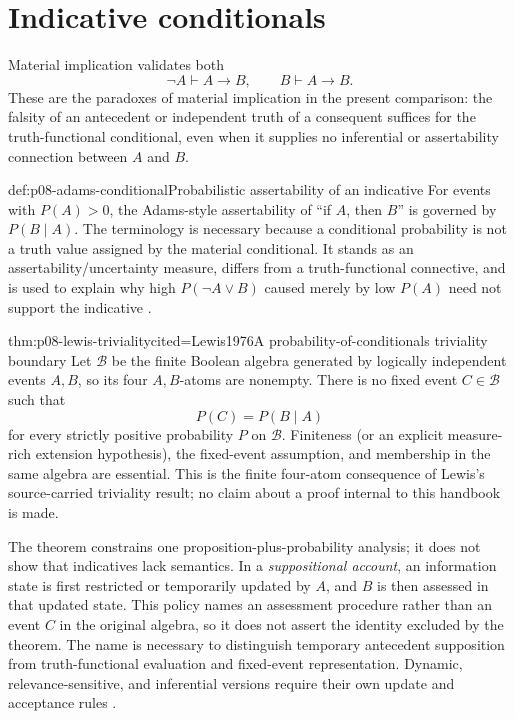 \section{Indicative conditionals}

Material implication validates both
\[
 \neg A\vdash A\to B,
 \qquad
 B\vdash A\to B.
\]
These are the paradoxes of material implication in the present comparison:
the falsity of an antecedent or independent truth of a consequent suffices for
the truth-functional conditional, even when it supplies no inferential or
assertability connection between \(A\) and \(B\).

\begin{hbdefinition}{def:p08-adams-conditional}{Probabilistic assertability of an indicative}
For events with \(P(A)>0\), the Adams-style assertability of ``if \(A\), then
\(B\)'' is governed by \(P(B\mid A)\). The terminology is necessary because a
conditional probability is not a truth value assigned by the material
conditional. It stands as an assertability/uncertainty measure, differs from a
truth-functional connective, and is used to explain why high
\(P(\neg A\vee B)\) caused merely by low \(P(A)\) need not support the
indicative \cite{Adams1975}.
\end{hbdefinition}

\begin{hbtheorem}{thm:p08-lewis-triviality}{cited=Lewis1976}{A probability-of-conditionals triviality boundary}
Let \(\mathcal B\) be the finite Boolean algebra generated by logically
independent events \(A,B\), so its four \(A,B\)-atoms are nonempty.  There is no
fixed event \(C\in\mathcal B\) such that
\[
 P(C)=P(B\mid A)
\]
for every strictly positive probability \(P\) on \(\mathcal B\).
Finiteness (or an explicit measure-rich extension hypothesis), the fixed-event
assumption, and membership in the same algebra are essential.  This is the
finite four-atom consequence of Lewis's source-carried triviality result; no
claim about a proof internal to this handbook is made.
\end{hbtheorem}

The theorem constrains one proposition-plus-probability analysis; it does not
show that indicatives lack semantics.  In a \emph{suppositional account}, an
information state is first restricted or temporarily updated by \(A\), and
\(B\) is then assessed in that updated state.  This policy names an
assessment procedure rather than an event \(C\) in the original algebra, so it
does not assert the identity excluded by the theorem.  The name is necessary
to distinguish temporary antecedent supposition from truth-functional
evaluation and fixed-event representation.  Dynamic,
relevance-sensitive, and inferential versions require their own update and
acceptance rules \cite{Jackson1987,Edgington1995,Bennett2003}.

